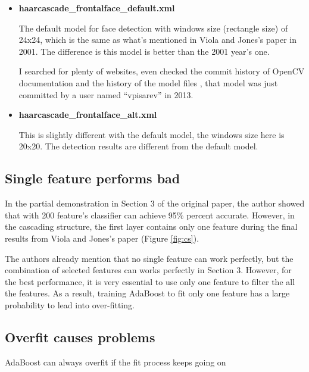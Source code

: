 \documentclass[10pt,twocolumn,letterpaper]{article}
\begin{document}
\begin{itemize}
    \item \textbf{haarcascade\_frontalface\_default.xml}

          The default model for face detection with windows size (rectangle size) of 24x24, which is the same as what's mentioned in Viola and Jones's paper in 2001.
          The difference is this model is better than the 2001 year's one.

          I searched for plenty of websites, even checked the commit history of OpenCV documentation \cite{opencvdochistory}
          and the history of the model files \cite{opencvmodelhistory}, that model was just committed by a user named ``vpisarev'' in 2013.

    \item \textbf{haarcascade\_frontalface\_alt.xml}

          This is slightly different with the default model, the windows size here is 20x20. The detection results are different from the default model.

\end{itemize}




\subsection{Single feature performs bad}
In the partial demonstration in Section 3 of the original paper, the author showed that with 200 feature's classifier can achieve 95\% percent accurate.
However, in the cascading structure, the first layer contains only one feature during the final results from Viola and Jones's paper (Figure \ref{fig:cs}).

The authors already mention that no single feature can work perfectly, but the combination of selected features can works perfectly in Section 3.
However, for the best performance, it is very essential to use only one feature to filter the all the features.
As a result, training AdaBoost to fit only one feature has a large probability to lead into over-fitting.

\subsection{Overfit causes problems}
AdaBoost can always overfit if the fit process keeps going on
\end{document}
